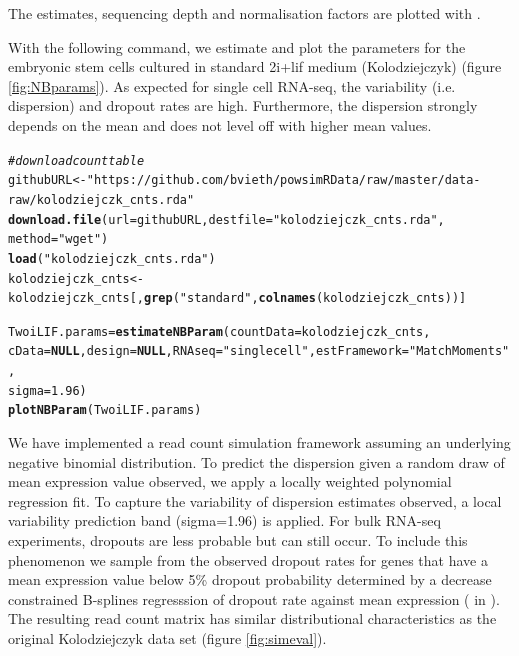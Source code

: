 \documentclass{article}\usepackage[]{graphicx}\usepackage[usenames,dvipsnames]{color}
\makeatletter
\newcommand{\hlnum}[1]{\textcolor[rgb]{0.686,0.059,0.569}{#1}}%
\newcommand{\hlstr}[1]{\textcolor[rgb]{0.192,0.494,0.8}{#1}}%
\newcommand{\hlcom}[1]{\textcolor[rgb]{0.678,0.584,0.686}{\textit{#1}}}%
\newcommand{\hlstd}[1]{\textcolor[rgb]{0.345,0.345,0.345}{#1}}%
\newcommand{\hlkwa}[1]{\textcolor[rgb]{0.161,0.373,0.58}{\textbf{#1}}}%
\newcommand{\hlkwb}[1]{\textcolor[rgb]{0.69,0.353,0.396}{#1}}%
\newcommand{\hlkwc}[1]{\textcolor[rgb]{0.333,0.667,0.333}{#1}}%
\newcommand{\hlkwd}[1]{\textcolor[rgb]{0.737,0.353,0.396}{\textbf{#1}}}%
\newenvironment{kframe}{%
 \def\at@end@of@kframe{}%
 \ifinner\ifhmode%
  \def\at@end@of@kframe{\end{minipage}}%
  \begin{minipage}{\columnwidth}%
 \fi\fi%
 \def\FrameCommand##1{\hskip\@totalleftmargin \hskip-\fboxsep
 \colorbox{shadecolor}{##1}\hskip-\fboxsep
     \hskip-\linewidth \hskip-\@totalleftmargin \hskip\columnwidth}%
 \MakeFramed {\advance\hsize-\width
   \@totalleftmargin\z@ \linewidth\hsize
   \@setminipage}}%
 {\par\unskip\endMakeFramed%
 \at@end@of@kframe}
\newenvironment{knitrout}{}{} %
\makeatother
\begin{document}
The estimates, sequencing depth and normalisation factors are plotted with .

With the following command, we estimate and plot the parameters for the embryonic stem cells cultured in standard 2i+lif medium (Kolodziejczyk) (figure \ref{fig:NBparams}). As expected for single cell RNA-seq, the variability (i.e. dispersion) and dropout rates are high. Furthermore, the dispersion strongly depends on the mean and does not level off with higher mean values.

\begin{knitrout}
\color{fgcolor}\begin{kframe}
\begin{alltt}
\hlcom{# download count table}
\hlstd{githubURL} \hlkwb{<-} \hlstr{"https://github.com/bvieth/powsimRData/raw/master/data-raw/kolodziejczk_cnts.rda"}
\hlkwd{download.file}\hlstd{(}\hlkwc{url} \hlstd{= githubURL,} \hlkwc{destfile} \hlstd{=} \hlstr{"kolodziejczk_cnts.rda"}\hlstd{,}
    \hlkwc{method} \hlstd{=} \hlstr{"wget"}\hlstd{)}
\hlkwd{load}\hlstd{(}\hlstr{"kolodziejczk_cnts.rda"}\hlstd{)}
\hlstd{kolodziejczk_cnts} \hlkwb{<-} \hlstd{kolodziejczk_cnts[,} \hlkwd{grep}\hlstd{(}\hlstr{"standard"}\hlstd{,} \hlkwd{colnames}\hlstd{(kolodziejczk_cnts))]}

\hlstd{TwoiLIF.params} \hlkwb{=} \hlkwd{estimateNBParam}\hlstd{(}\hlkwc{countData} \hlstd{= kolodziejczk_cnts,}
    \hlkwc{cData} \hlstd{=} \hlkwa{NULL}\hlstd{,} \hlkwc{design} \hlstd{=} \hlkwa{NULL}\hlstd{,} \hlkwc{RNAseq} \hlstd{=} \hlstr{"singlecell"}\hlstd{,} \hlkwc{estFramework} \hlstd{=} \hlstr{"MatchMoments"}\hlstd{,}
    \hlkwc{sigma} \hlstd{=} \hlnum{1.96}\hlstd{)}
\hlkwd{plotNBParam}\hlstd{(TwoiLIF.params)}
\end{alltt}
\end{kframe}
\end{knitrout}

We have implemented a read count simulation framework assuming an underlying negative binomial distribution.
To predict the dispersion given a random draw of mean expression value observed, we apply a locally weighted polynomial regression fit. To capture the variability of dispersion estimates observed, a local variability prediction band (sigma=1.96) is applied.
For bulk RNA-seq experiments, dropouts are less probable but can still occur. To include this phenomenon we sample from the observed dropout rates for genes that have a mean expression value below 5\% dropout probability determined by a decrease constrained B-splines regresssion of dropout rate against mean expression ( in ).
The resulting read count matrix has similar distributional characteristics as the original Kolodziejczyk data set (figure \ref{fig:simeval}).
\end{document}
